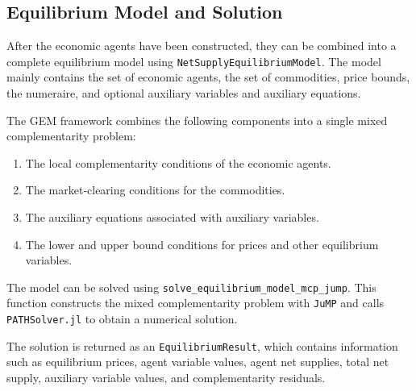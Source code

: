 \documentclass[
  letterpaper,
  DIV=11,
  numbers=noendperiod]{scrreprt}
\begin{document}
\subsection{Equilibrium Model and
Solution}\label{equilibrium-model-and-solution}

After the economic agents have been constructed, they can be combined
into a complete equilibrium model using
\texttt{NetSupplyEquilibriumModel}. The model mainly contains the set of
economic agents, the set of commodities, price bounds, the numeraire,
and optional auxiliary variables and auxiliary equations.

The GEM framework combines the following components into a single mixed
complementarity problem:

\begin{enumerate}
\def\labelenumi{\arabic{enumi}.}
\item
  The local complementarity conditions of the economic agents.
\item
  The market-clearing conditions for the commodities.
\item
  The auxiliary equations associated with auxiliary variables.
\item
  The lower and upper bound conditions for prices and other equilibrium
  variables.
\end{enumerate}

The model can be solved using
\texttt{solve\_equilibrium\_model\_mcp\_jump}. This function constructs
the mixed complementarity problem with \texttt{JuMP} and calls
\texttt{PATHSolver.jl} to obtain a numerical solution.

The solution is returned as an \texttt{EquilibriumResult}, which
contains information such as equilibrium prices, agent variable values,
agent net supplies, total net supply, auxiliary variable values, and
complementarity residuals.
\end{document}
